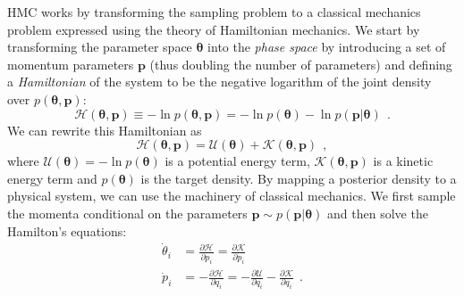 \documentclass[12pt,dvipsnames]{report}
\renewcommand{\vec}[1]{\boldsymbol{\mathbf{#1}}}
\newcommand{\hquad}{~~}
\begin{document}
HMC works by transforming the sampling problem to a classical mechanics 
problem expressed using the theory of Hamiltonian mechanics. 
We start by transforming the parameter space $\boldsymbol{\theta}$ into the 
\emph{phase space} by 
introducing a set of momentum parameters $\vec{p}$ (thus doubling the number of 
parameters) and defining a \emph{Hamiltonian} of the system to be the negative logarithm 
of the  joint density over $p(\vec{\theta}, \vec{p})$:
\begin{equation}
    \mathcal{H}(\boldsymbol{\theta},\mathbf p)\equiv -\ln p(\boldsymbol{\theta},\mathbf p)=-\ln p(\boldsymbol{\theta})-\ln p(\mathbf p\lvert\boldsymbol{\theta})
    \hquad.
\end{equation}
We can rewrite this Hamiltonian as
\begin{equation}
    \mathcal{H}(\boldsymbol{\theta},\mathbf p)= \mathcal{U}(\boldsymbol{\theta})  + 
    \mathcal{K}(\boldsymbol{\theta},\mathbf p)
    \hquad,
\end{equation}
where $\mathcal{U}(\boldsymbol{\theta})=-\ln p(\vec \theta)$ is a potential energy term,
 $\mathcal{K}(\boldsymbol{\theta},\vec p)$ is a kinetic energy term and 
 $p(\vec\theta)$ is the target  density.
By mapping a posterior density to a physical system, we can use the machinery of 
classical mechanics. We first sample the momenta conditional on the parameters 
$\mathbf{p}\sim p(\mathbf{p}\lvert\boldsymbol{\theta})$
 and then solve the Hamilton's equations:
\begin{align}
  \dot{\theta}_i&=\frac{\partial\mathcal{H}}{\partial p_i}=\frac{\partial\mathcal{K}}{\partial p_i}\\
  \dot{p}_i&=-\frac{\partial\mathcal{H}}{\partial q_i}=-\frac{\partial\mathcal{U}}{\partial q_i} - 
  \frac{\partial\mathcal{K}}{\partial q_i}
  \hquad.
\end{align}
\end{document}

